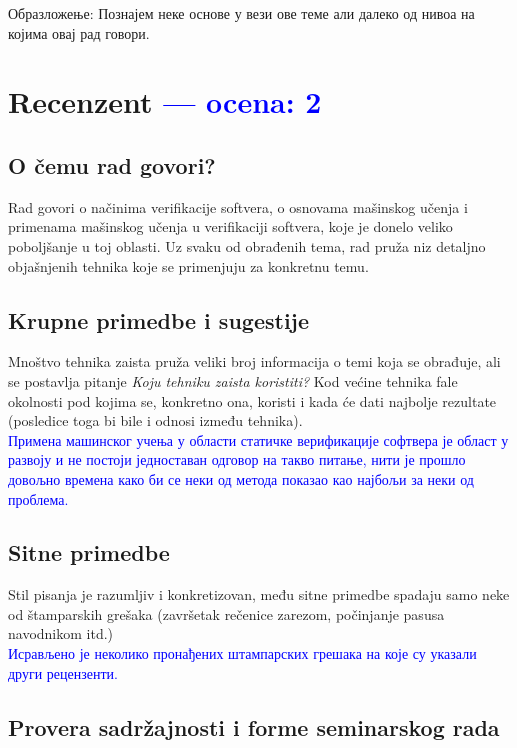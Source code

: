 \documentclass[a4paper]{report}
\newcommand{\odgovor}[1]{\textcolor{blue}{#1}}
\newcommand{\say}[1]{\textit{#1}}
\begin{document}
Образложење: Познајем неке основе у вези ове теме али далеко од нивоа на којима овај рад говори.


\chapter{Recenzent \odgovor{--- ocena: 2} }


\section{O čemu rad govori?}
Rad govori o načinima verifikacije softvera, o osnovama mašinskog učenja i primenama mašinskog učenja u verifikaciji softvera, koje je donelo veliko poboljšanje u toj oblasti. Uz svaku od obrađenih tema, rad pruža niz detaljno objašnjenih tehnika koje se primenjuju za konkretnu temu.

\section{Krupne primedbe i sugestije}
Mnoštvo tehnika zaista pruža veliki broj informacija o temi koja se obrađuje, ali se postavlja pitanje \say {Koju tehniku zaista koristiti?} Kod većine tehnika fale okolnosti pod kojima se, konkretno ona, koristi i kada će dati najbolje rezultate (posledice toga bi bile i odnosi između tehnika).\\

\odgovor{Примена машинског учења у области статичке верификације софтвера је област у развоју и не постоји
    једноставан одговор на такво питање, нити је прошло довољно времена како би се неки од метода показао као најбољи за неки од проблема.
}
\\

\section{Sitne primedbe}
Stil pisanja je razumljiv i konkretizovan, među sitne primedbe spadaju samo neke od štamparskih grešaka (završetak rečenice zarezom, počinjanje pasusa navodnikom itd.)\\

\odgovor{Исрављено је неколико пронађених штампарских грешака на које су указали други рецензенти.}
\\


\section{Provera sadržajnosti i forme seminarskog rada}
\end{document}
